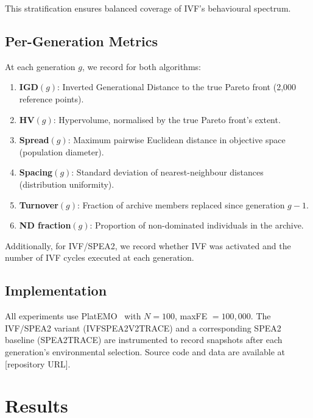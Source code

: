 \documentclass[runningheads]{llncs}
\begin{document}
This stratification ensures balanced coverage of IVF's behavioural
spectrum.

\subsection{Per-Generation Metrics}

At each generation $g$, we record for both algorithms:

\begin{enumerate}
  \item \textbf{IGD}$(g)$: Inverted Generational Distance to the true
    Pareto front (2{,}000 reference points).
  \item \textbf{HV}$(g)$: Hypervolume, normalised by the true Pareto
    front's extent.
  \item \textbf{Spread}$(g)$: Maximum pairwise Euclidean distance in
    objective space (population diameter).
  \item \textbf{Spacing}$(g)$: Standard deviation of nearest-neighbour
    distances (distribution uniformity).
  \item \textbf{Turnover}$(g)$: Fraction of archive members replaced
    since generation $g{-}1$.
  \item \textbf{ND fraction}$(g)$: Proportion of non-dominated
    individuals in the archive.
\end{enumerate}

Additionally, for IVF/SPEA2, we record whether IVF was activated and the
number of IVF cycles executed at each generation.

\subsection{Implementation}

All experiments use PlatEMO~\cite{tian2017platemo} with $N = 100$,
maxFE $= 100{,}000$. The IVF/SPEA2 variant (IVFSPEA2V2TRACE) and a
corresponding SPEA2 baseline (SPEA2TRACE) are instrumented to record
snapshots after each generation's environmental selection. Source code
and data are available at [repository URL].


\section{Results}
\label{sec:results}

\end{document}
